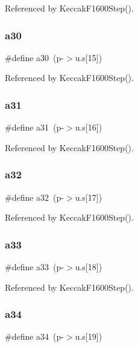 Referenced by Keccak\+F1600\+Step().

\mbox{\label{shell_8c_aa02b6491041e37d6d2da292c2af86c67}} 
\subsubsection{a30}
{\footnotesize\ttfamily \#define a30~(p-\/$>$u.\+s[15])}



Referenced by Keccak\+F1600\+Step().

\mbox{\label{shell_8c_ab0888f8eab4990ccae10bc707755c9d4}} 
\subsubsection{a31}
{\footnotesize\ttfamily \#define a31~(p-\/$>$u.\+s[16])}



Referenced by Keccak\+F1600\+Step().

\mbox{\label{shell_8c_a3a2b5ffef4026ac42abfa6f0f9cc1946}} 
\subsubsection{a32}
{\footnotesize\ttfamily \#define a32~(p-\/$>$u.\+s[17])}



Referenced by Keccak\+F1600\+Step().

\mbox{\label{shell_8c_ad75e236d7040db1ae344408df7652c00}} 
\subsubsection{a33}
{\footnotesize\ttfamily \#define a33~(p-\/$>$u.\+s[18])}



Referenced by Keccak\+F1600\+Step().

\mbox{\label{shell_8c_a671cc0a1ce2292b84347c89315e51d1d}} 
\subsubsection{a34}
{\footnotesize\ttfamily \#define a34~(p-\/$>$u.\+s[19])}



